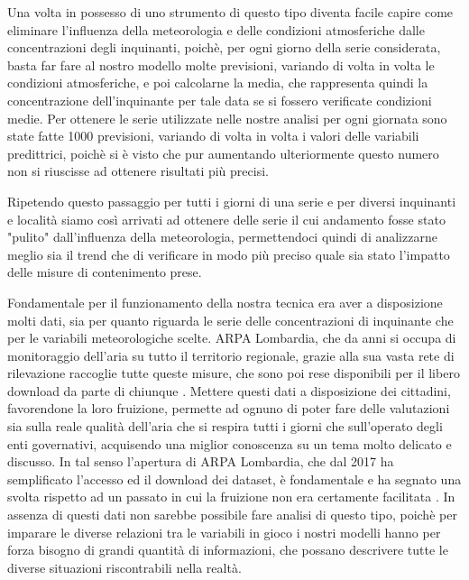 \documentclass[a4paper,12pt]{report}
\begin{document}
Una volta in possesso di uno strumento di questo tipo diventa facile capire come eliminare l'influenza della meteorologia e delle condizioni atmosferiche dalle concentrazioni degli inquinanti, poichè, per ogni giorno della serie considerata, basta far fare al nostro modello molte previsioni, variando di volta in volta le condizioni atmosferiche, e poi calcolarne la media, che rappresenta quindi la concentrazione dell'inquinante per tale data se si fossero verificate condizioni medie. Per ottenere le serie utilizzate nelle nostre analisi per ogni giornata sono state fatte 1000 previsioni, variando di volta in volta i valori delle variabili predittrici, poichè si è visto che pur aumentando ulteriormente questo numero non si riuscisse ad ottenere risultati più precisi.

Ripetendo questo passaggio per tutti i giorni di una serie e per diversi inquinanti e località siamo così arrivati ad ottenere delle serie il cui andamento fosse stato "pulito" dall'influenza della meteorologia, permettendoci quindi di analizzarne meglio sia il trend che di verificare in modo più preciso quale sia stato l'impatto delle misure di contenimento prese.  

Fondamentale per il funzionamento della nostra tecnica era aver a disposizione molti dati, sia per quanto riguarda le serie delle concentrazioni di inquinante che per le variabili meteorologiche scelte. ARPA Lombardia, che da anni si occupa di monitoraggio dell'aria su tutto il territorio regionale, grazie alla sua vasta rete di rilevazione raccoglie tutte queste misure, che sono poi rese disponibili per il libero download
da parte di chiunque \cite{arpa_aria, arpa_meteo}. Mettere questi dati a disposizione dei cittadini, favorendone la loro fruizione, permette ad ognuno di poter fare delle valutazioni sia sulla reale qualità dell'aria che si respira tutti i giorni che sull'operato degli enti governativi, acquisendo una miglior conoscenza su un tema molto delicato e discusso. In tal senso l'apertura di ARPA Lombardia, che dal 2017 ha semplificato l'accesso ed il download dei dataset, è fondamentale e ha segnato una svolta rispetto ad un passato in cui la fruizione non era certamente facilitata \cite{trentini2014lombardy}. 
In assenza di questi dati non sarebbe possibile fare analisi di questo tipo, poichè per imparare le diverse relazioni tra le variabili in gioco i nostri modelli hanno per forza bisogno di grandi quantità di informazioni, che possano descrivere tutte le diverse situazioni riscontrabili nella realtà.
\end{document}
